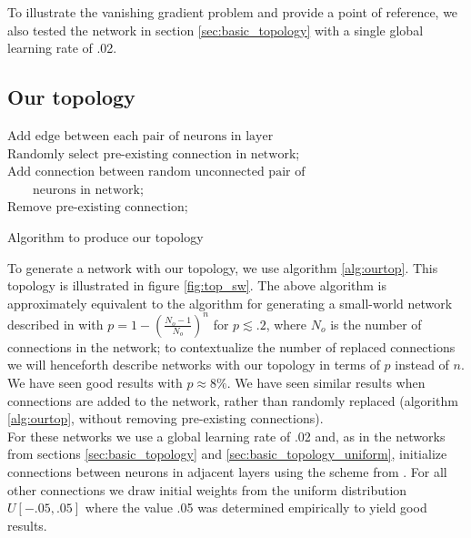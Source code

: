 \documentclass[utf8]{frontiersSCNS}
\newcommand{\npar}{\\\indent}
\begin{document}
To illustrate the vanishing gradient problem and provide a point of reference, we also tested the network in section \ref{sec:basic_topology} with a single global learning rate of .02.

\subsection{Our topology}
\label{sec:our_topology}


\begin{algorithm}
{
	$\text{Add edge between each pair of neurons in layer}$
}
{
	$\text{Randomly select pre-existing connection in network}$;\\
	$\text{Add connection between random unconnected pair of}$\\
	$\qquad\text{neurons in network}$;\\
	$\text{Remove pre-existing connection}$;
}

\caption{Algorithm to produce our topology}
\label{alg:ourtop}
\end{algorithm}

To generate a network with our topology, we use algorithm \ref{alg:ourtop}. This topology is illustrated in figure \ref{fig:top_sw}. The above algorithm is approximately equivalent to the algorithm for generating a small-world network described in \citep{watts98} with $p=1-(\frac{N_o-1}{N_o})^n$ for $p\lesssim .2$, where $N_o$ is the number of connections in the network; to contextualize the number of replaced connections we will henceforth describe networks with our topology in terms of $p$ instead of $n$. We have seen good results with $p\approx 8\%$. We have seen similar results when connections are added to the network, rather than randomly replaced (algorithm \ref{alg:ourtop}, without removing pre-existing connections).
\npar
For these networks we use a global learning rate of .02 and, as in the networks from sections \ref{sec:basic_topology} and \ref{sec:basic_topology_uniform}, initialize connections between neurons in adjacent layers using the scheme from \cite{glorot2010}. For all other connections we draw initial weights from the uniform distribution $U[-.05, .05]$ where the value .05 was determined empirically to yield good results.
\end{document}

